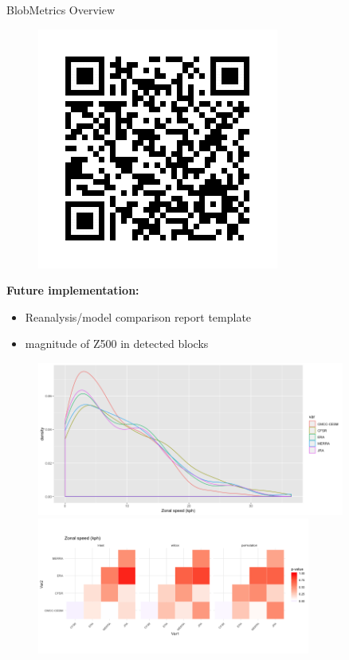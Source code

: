 \documentclass[final]{beamer}
\newlength{\onecolwid}
\begin{document}
\begin{frame}[t]
\begin{columns}[t]
\begin{column}{\onecolwid}
\begin{alertblock}{BlobMetrics Overview}
\begin{minipage}[h]{0.25\textwidth}
\begin{figure}
\includegraphics[width=\textwidth]{frame.png}
    \label{fig:qr}
\end{figure}
\end{minipage}
\textbf{Future implementation:}
\begin{itemize}
    \item Reanalysis/model comparison report template
    \item magnitude of Z500 in detected blocks
\end{itemize}
\end{alertblock}
\begin{figure}
    \centering
    \includegraphics[width=0.9\textwidth]{speed_dist.png}\\
    \includegraphics[width=0.8\textwidth]{speed_pvalue.png}

\end{figure}
\end{column}
\end{columns}
\end{frame}
\end{document}
